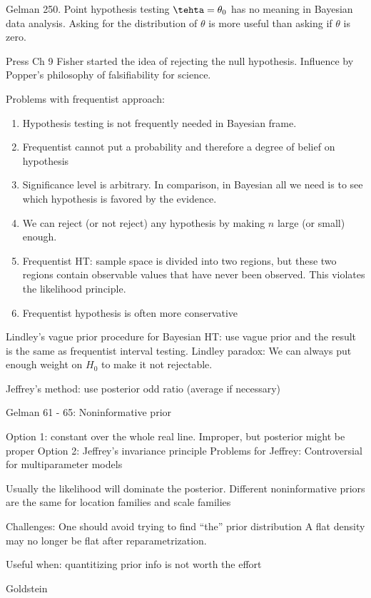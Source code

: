 \documentclass{amsart}
\begin{document}
Gelman 250.
Point hypothesis testing $\tehta = \theta_0$ has no meaning in Bayesian data analysis.
Asking for the distribution of $\theta$ is more useful than asking if $\theta$ is zero.

Press Ch 9
Fisher started the idea of rejecting the null hypothesis.
Influence by Popper's philosophy of falsifiability for science.

Problems with frequentist approach:
\begin{enumerate}
\item Hypothesis testing is not frequently needed in Bayesian frame.
\item Frequentist cannot put a probability and therefore a degree of belief on hypothesis
\item Significance level is arbitrary. In comparison, in Bayesian all we need is to see which hypothesis is favored by the evidence.
\item We can reject (or not reject) any hypothesis by making $n$ large (or small) enough.
\item Frequentist HT: sample space is divided into two regions, but these two regions contain observable values that have never been observed. This violates the likelihood principle.
  \item Frequentist hypothesis is often more conservative
\end{enumerate}

Lindley's vague prior procedure for Bayesian HT: use vague prior and the result is the same as frequentist interval testing.
Lindley paradox: We can always put enough weight on $H_0$ to make it not rejectable.

Jeffrey's method: use posterior odd ratio (average if necessary)

Gelman 61 - 65: Noninformative prior

Option 1: constant over the whole real line. Improper, but posterior might be proper
Option 2: Jeffrey's invariance principle
Problems for Jeffrey:
Controversial for multiparameter models


Usually the likelihood will dominate the posterior.
Different noninformative priors are the same for location families and scale families

Challenges:
One should avoid trying to find ``the'' prior distribution
A flat density may no longer be flat after reparametrization.

Useful when:
quantitizing prior info is not worth the effort

Goldstein
\end{document}
